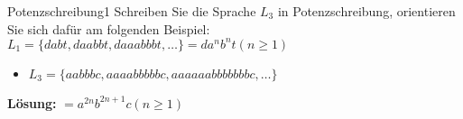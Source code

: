 \documentclass{julie-exercises}
\begin{document}
\author{Prof. Dr. Udo Hahn, Luise Modersohn}
\date{24.01.2019}
\maketitle

\begin{aufgabe}{Potenzschreibung}{1}
	Schreiben Sie die Sprache $L_3$ in Potenzschreibung, orientieren Sie sich dafür am folgenden Beispiel: \\
	$ L_1 = \{ dabt, daabbt, daaabbbt, \ldots \} = d a^n b^n t (n \geq 1)$
	\vspace*{-8pt}

	\begin{itemize}
		\item $ L_3 = \{ aabbbc, aaaabbbbbc, aaaaaabbbbbbbc, \ldots \} $
	\end{itemize}
	\begin{loesung}
		{\bf L\"{o}sung:}
		$ = a^{2n} b^{2n+1} c (n \geq 1)$
	\end{loesung}
\end{aufgabe}
\end{document}
